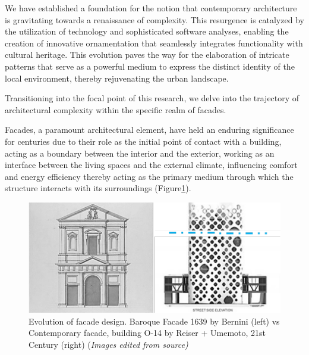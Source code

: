 

We have established a foundation for the notion that contemporary architecture is gravitating towards a renaissance of complexity.
This resurgence is catalyzed by the utilization of technology and sophisticated software analyses, enabling the creation of innovative ornamentation that seamlessly integrates functionality with cultural heritage.
This evolution paves the way for the elaboration of intricate patterns that serve as a powerful medium to express the distinct identity of the local environment, thereby rejuvenating the urban landscape.

Transitioning into the focal point of this research, we delve into the trajectory of architectural complexity within the specific realm of facades.

Facades, a paramount architectural element, have held an enduring significance for centuries due to their role as the initial point of contact with a building, acting as a boundary between the interior and the exterior, working as an interface between the living spaces and the external climate, influencing comfort and energy efficiency\cite{Kamal2020} thereby acting as the primary medium through which the structure interacts with its surroundings (Figure\ref{fig:FacadeBaroqueVsContemporary}).

     \begin{figure}[htb]
          \centering
          \includegraphics[width= \linewidth]{Images/BaroqueVsContemporaryfacade}
          \caption{Evolution of facade design.
          Baroque Facade 1639 by Bernini (left) vs Contemporary facade, building O-14 by Reiser + Umemoto, 21st Century (right) (\textit{Images edited from source)}}
          \label{fig:FacadeBaroqueVsContemporary}
        \end{figure}

